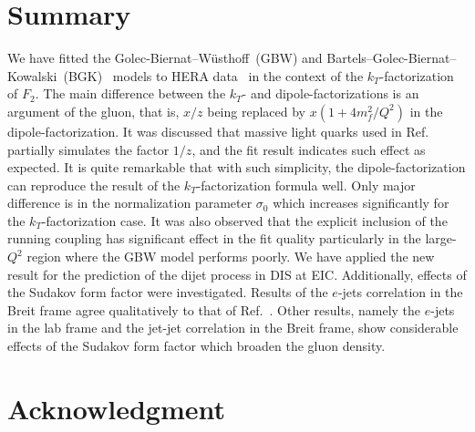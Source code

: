 \documentclass[12pt]{article}
\numberwithin{equation}{section}
\numberwithin{table}{section}
\numberwithin{figure}{section}
\begin{document}
\section{Summary}
We have fitted the Golec-Biernat--W\"usthoff~(GBW)\cite{Golec-Biernat:1998zce} and Bartels--Golec-Biernat--Kowalski~(BGK)~\cite{Bartels:2002cj} models to HERA data~\cite{Abt:2017nkc} in the context of the $k_T$-factorization of $F_2$.  The main difference between the $k_T$- and dipole-factorizations is an argument of the gluon, that is, $x/z$ being replaced by $x(1+4m_f^2/Q^2)$ in the dipole-factorization. It was discussed that massive light quarks used in Ref.~\cite{Golec-Biernat:1998zce} partially simulates the factor $1/z$, and the fit result indicates such effect as expected. It is quite remarkable that with such simplicity, the dipole-factorization can reproduce the result of the $k_T$-factorization formula well. Only major difference is in the normalization parameter $\sigma_0$ which increases significantly for the $k_T$-factorization case. It was also observed that the explicit inclusion of the running coupling has significant effect in the fit quality particularly in the large-$Q^2$ region where the GBW model performs poorly. 
We have applied the new result for the prediction of the dijet process in DIS at EIC. Additionally, effects of the Sudakov form factor were investigated. Results of the $e$-jets correlation in the Breit frame agree qualitatively to that of Ref.~\cite{vanHameren:2021sqc}. Other results, namely the $e$-jets in the lab frame and the jet-jet correlation in the Breit frame, show considerable effects of the Sudakov form factor which broaden the gluon density.  

\section*{Acknowledgment}


\clearpage
%
\printbibliography

% 

%
\end{document}
